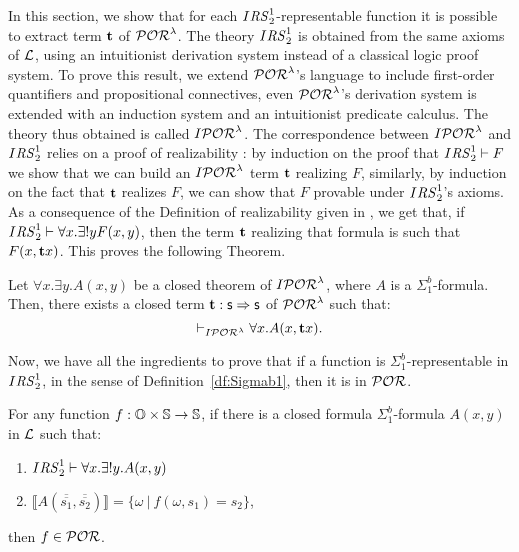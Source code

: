 {In this section, we show that for each $I{\mathit{RS}^1_2}$-representable function
it is possible to extract term ${\mathbf t}$ of $\mathcal{POR}^\lambda$.
The theory $I{\mathit{RS}^1_2}$ is
obtained from the same axioms of $\mathcal{L}$, using an
intuitionist derivation system instead of a
classical logic proof system.
%
To prove this result, we extend $\mathcal{POR}^\lambda$'s language to include
first-order quantifiers and propositional connectives,
even $\mathcal{POR}^\lambda$'s derivation system is extended with an
induction system and an intuitionist predicate calculus.
The theory thus obtained is called $I\mathcal{POR}^\lambda$.
%
The correspondence between $I\mathcal{POR}^\lambda$ and $I{\mathit{RS}^1_2}$ relies on
a proof of realizability \cite{Buss98, CookUrquhart}: by induction on the
proof that $I{\mathit{RS}^1_2} \vdash F$ we show that we can build an
$I\mathcal{POR}^\lambda$ term ${\mathbf t}$ realizing $F$, similarly, by induction on
the fact that ${\mathbf t}$ realizes $F$, we can show that $F$ provable under
$I{\mathit{RS}^1_2}$'s axioms. As a consequence of the Definition of realizability
given in \cite{RBA},
we get that, if $I{\mathit{RS}^1_2}\vdash \forall x.\exists ! y F(x, y)$, then the
term ${\mathbf t}$ realizing that formula is such that  $F(x, {\mathbf t} x)$.
This proves the following Theorem.

  \begin{theorem}\label{cor:PORTerm}
Let $\forall x.\exists y.A(x,y)$
be a closed theorem of $I\mathcal{POR}^\lambda$,
where $A$ is a $\Sigma^b_1$-formula.
Then, there exists a closed term ${\mathbf t}:\mathsf{s} \Rightarrow \mathsf{s}$
of $\mathcal{POR}^\lambda$ such that:
$$
\vdash_{I\mathcal{POR}^\lambda} \forall x.A(x,{\mathbf t} x).
$$
\end{theorem}












Now, we have all the ingredients to prove that
if a function is $\Sigma^b_1$-representable
in $I{\mathit{RS}^1_2}$, in the sense of Definition~\ref{df:Sigmab1},
then
it is in $\mathcal{POR}$.





\begin{cor}\label{cor:taskBmain1}
%
For any function $f:\mathbb{O} \times \mathbb{S} \rightarrow \mathbb{S}$,
if there is a closed formula $\Sigma^b_1$-formula
$A(x,y)$ in $\mathcal{L}$ such that:
%
%
\begin{enumerate}
\itemsep0em
\item $I{\mathit{RS}^1_2} \vdash \forall x.\exists !y.A (x,y)$
%
\item $\llbracket A(\overline{\overline{s_1}},\overline{\overline{s_2}})\rrbracket
=\{\omega \ | \ f(\omega,s_1)=s_2\}$,
%
\end{enumerate}
then $f\in\mathcal{POR}$.
\end{cor}

}
